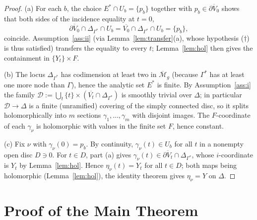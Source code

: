 \documentclass[11pt]{amsart}
\theoremstyle{definition}
\theoremstyle{remark}
\newcommand{\M}{\mathcal{M}}
\begin{document}
\begin{proof}
(a) For each $b$, the choice $E^*\cap U_b=\{p_b\}$ together with
$p_b\in\overline{\partial V_0}$ shows that both sides of the incidence
equality at $t=0$,
\[
\overline{\partial V_0}\cap\Delta_{\Gamma^*}\cap U_b
=\overline{V_0}\cap\Delta_{\Gamma^*}\cap U_b=\{p_b\},
\]
coincide. Assumption~\ref{ass:ii} (via Lemma~\ref{lem:transfer}(a), whose
hypothesis ($\dagger$) is thus satisfied) transfers the equality to every
$t$; Lemma~\ref{lem:hol} then gives the containment in $\{Y_t\}\times F$.

(b) The locus $\Delta_{\Gamma^*}$ has codimension at least two in
$\overline{\M}_g$ (because $\Gamma^*$ has at least one more node than
$\Gamma$), hence the analytic set $E^*$ is finite. By
Assumption~\ref{ass:i} the family
$\mathcal{D}:=\bigcup_t\{t\}\times(\overline{V_t}\cap\Delta_{\Gamma^*})$ is
smoothly trivial over $\Delta$; in particular
$\mathcal{D}\to\Delta$ is a finite (unramified) covering of the simply
connected disc, so it splits holomorphically into $m$ sections
$\gamma_1,\dots,\gamma_m$ with disjoint images. The $F$-coordinate of each
$\gamma_\nu$ is holomorphic with values in the finite set $F$, hence
constant.

(c) Fix $\nu$ with $\gamma_\nu(0)=p_b$. By continuity, $\gamma_\nu(t)\in U_b$
for all $t$ in a nonempty open disc $D\ni 0$. For $t\in D$, part (a) gives
$\gamma_\nu(t)\in\overline{\partial V_t}\cap\Delta_{\Gamma^*}$, whose
$i$-coordinate is $Y_t$ by Lemma~\ref{lem:hol}. Hence
$\eta_\nu(t)=Y_t$ for all $t\in D$; both maps being holomorphic
(Lemma~\ref{lem:hol}), the identity theorem gives $\eta_\nu=Y$ on $\Delta$.
\end{proof}

\section{Proof of the Main Theorem}
\end{document}
